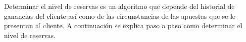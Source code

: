 %
%
%
%

Determinar el nivel de reservas es un algoritmo que depende del historial de ganancias del cliente así como de las circunstancias de las apuestas que se le presentan al cliente. A continuación se explica paso a paso como determinar el nivel de reservas.

